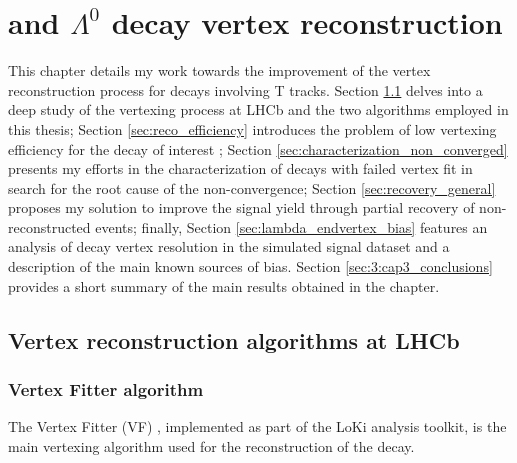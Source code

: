 \chapter{\texorpdfstring{\lbz}{Lambdab} and \texorpdfstring{$\Lambda^0$}{Lambda} decay vertex reconstruction}
\label{cap:vertex_reconstruction}
This chapter details my work towards the improvement of the vertex reconstruction process for decays involving T tracks.
Section \ref{sec:reco_algorithms} delves into a deep study of the vertexing process at LHCb and the two algorithms employed in this thesis;
Section \ref{sec:reco_efficiency} introduces the problem of low vertexing efficiency for the decay of interest \demonstratorshort;
Section \ref{sec:characterization_non_converged} presents my efforts in the characterization of decays with failed vertex fit in search for the root cause of the non-convergence;
Section \ref{sec:recovery_general} proposes my solution to improve the signal yield through partial recovery of non-reconstructed events;
finally, Section \ref{sec:lambda_endvertex_bias} features an analysis of \lambdadecay decay vertex resolution in the simulated signal dataset and a description of the main known sources of bias.
Section \ref{sec:3:cap3_conclusions} provides a short summary of the main results obtained in the chapter.

\section{Vertex reconstruction algorithms at LHCb}
\label{sec:reco_algorithms}

\subsection{Vertex Fitter algorithm}
The Vertex Fitter (VF) \cite{twiki_vf}, implemented as part of the LoKi analysis toolkit, is the main vertexing algorithm used for the reconstruction of the \lbz decay.

